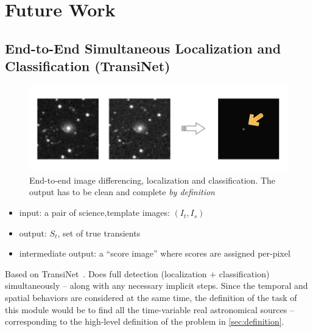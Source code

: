 \section{Future Work}
\subsection{End-to-End Simultaneous Localization and Classification (TransiNet)}

\begin{figure}[h]
  \centering
  \includegraphics[width=.8\textwidth]{material/transinet-teaser}
  \caption{End-to-end image differencing, localization and classification. The output has to be clean and complete \emph{by definition} }
  \label{fig:transinet-teaser}
\end{figure}

\begin{itemize}
  \item input: a pair of science,template images: $(I_t,I_s)$
  \item output: $S_t$, set of true transients
  \item intermediate output: a ``score image'' where scores are assigned per-pixel
\end{itemize}

Based on TransiNet~\cite{transinet}. Does full detection (localization + classification) simultaneously -- along with any necessary implicit steps.
Since the temporal and spatial behaviors are considered at the same time, the definition of the task of this module would be to find all the time-variable real astronomical sources -- corresponding to the high-level definition of the problem in \ref{sec:definition}.







